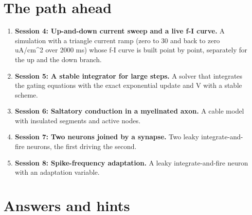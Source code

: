 \documentclass[11pt,a4paper]{article}
\begin{document}
\section{The path ahead}
\begin{enumerate}[nosep]
\item \textbf{Session 4: Up-and-down current sweep and a live f-I curve.} A simulation with a triangle current ramp (zero to 30 and back to zero uA/cm\textasciicircum{}2 over 2000 ms) whose f-I curve is built point by point, separately for the up and the down branch.
\item \textbf{Session 5: A stable integrator for large steps.} A solver that integrates the gating equations with the exact exponential update and V with a stable scheme.
\item \textbf{Session 6: Saltatory conduction in a myelinated axon.} A cable model with insulated segments and active nodes.
\item \textbf{Session 7: Two neurons joined by a synapse.} Two leaky integrate-and-fire neurons, the first driving the second.
\item \textbf{Session 8: Spike-frequency adaptation.} A leaky integrate-and-fire neuron with an adaptation variable.
\end{enumerate}

\section{Answers and hints}
\end{document}
